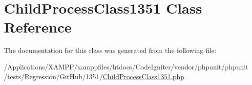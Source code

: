 \hypertarget{class_child_process_class1351}{}\section{Child\+Process\+Class1351 Class Reference}
\label{class_child_process_class1351}


The documentation for this class was generated from the following file\+:\begin{DoxyCompactItemize}
\item 
/\+Applications/\+X\+A\+M\+P\+P/xamppfiles/htdocs/\+Code\+Igniter/vendor/phpunit/phpunit/tests/\+Regression/\+Git\+Hub/1351/\mbox{\hyperlink{_child_process_class1351_8php}{Child\+Process\+Class1351.\+php}}\end{DoxyCompactItemize}
